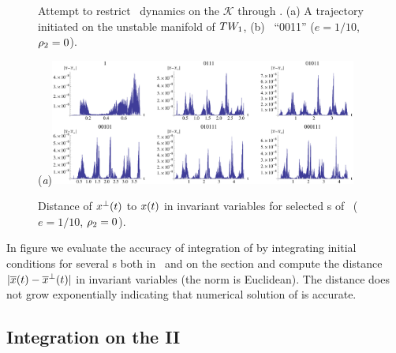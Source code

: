 {\begin{figure}[ht]
\begin{center}
\end{center}
\caption[\CLe\ desymmetrization with transverse integration]{
Attempt to restrict \CLe\ dynamics on the {\slice} $\mathcal{K}$ through
. (a) A trajectory initiated on the unstable
manifold of $TW_{1}$, (b) \rpo\ ``0011''
($e=1/10$, $\rho_2=0$).
    }
\label{fig:CLEtransv}
\end{figure}

\begin{figure}[ht]
\begin{center}
  (\textit{a})\includegraphics[width=0.9\textwidth, clip=true]{../figs/CLEerrTransv}
\end{center}
\caption[Numerical error in \CLe\ desymmetrization with transverse integration]{
Distance of $x^\perp(t)$ to $x(t)$ in invariant variables
for selected \rpo s of \CLe\,
($e=1/10$, $\rho_2=0$).
    }
\label{fig:CLEerrTransv}
\end{figure}

In figure  we evaluate the accuracy
of integration of  by integrating
initial conditions for several \rpo s both in \statesp\ and
on the section and compute the distance
$|\overline{x}(t)-\overline{x}^\perp(t)|$ in invariant
variables  (the norm is Euclidean). The
distance does not grow exponentially indicating that
numerical solution of  is accurate.

\subsection{Integration on the {\slice} II}

    }%
